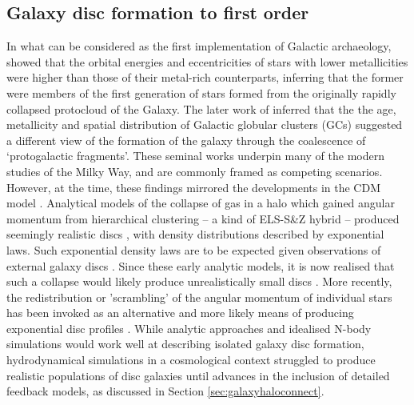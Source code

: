 \subsection{Galaxy disc formation to first order}


In what can be considered as the first implementation of Galactic archaeology, \citet[the ELS model]{1962ApJ...136..748E} showed that the orbital energies and eccentricities of stars with lower metallicities were higher than those of their metal-rich counterparts, inferring that the former were members of the first generation of stars formed from the originally rapidly collapsed protocloud of the Galaxy. The later work of \citet[the S\&Z model]{1978ApJ...225..357S} inferred that the the age, metallicity and spatial distribution of Galactic globular clusters (GCs) suggested a different view of the formation of the galaxy through the coalescence of `protogalactic fragments'. These seminal works underpin many of the modern studies of the Milky Way, and are commonly framed as competing scenarios. However, at the time, these findings mirrored the developments in the CDM model \citep{1978MNRAS.183..341W}. Analytical models of the collapse of gas in a halo which gained angular momentum from hierarchical clustering -- a kind of ELS-S\&Z hybrid -- produced seemingly realistic discs \citep{1980MNRAS.193..189F}, with density distributions described by exponential laws. Such exponential density laws are to be expected given observations of external galaxy discs \citep[e.g.][]{1959HDP....53..311D,1970ApJ...160..811F,1983MNRAS.202.1025G,2006A&A...454..759P}. Since these early analytic models, it is now realised that such a collapse would likely produce unrealistically small discs \citep[e.g.][]{2000MNRAS.317..697E}. More recently, the redistribution or 'scrambling' of the angular momentum of individual stars has been invoked as an alternative and more likely means of producing exponential disc profiles \citep[e.g.][]{2013ApJ...775L..35E,2016ApJ...830..115E,2016arXiv161203171H}. While analytic approaches and idealised N-body simulations would work well at describing isolated galaxy disc formation, hydrodynamical simulations in a cosmological context struggled to produce realistic populations of disc galaxies until advances in the inclusion of detailed feedback models, as discussed in Section \ref{sec:galaxyhaloconnect}. 

